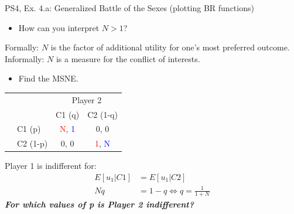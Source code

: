 \begin{frame}{PS4, Ex. 4.a: Generalized Battle of the Sexes (plotting BR functions)}
  \begin{multicols}{2}
    \begin{itemize}
      \item[(a)] How can you interpret $N > 1$?
    \end{itemize}
    Formally: $N$ is the factor of additional utility for one's most preferred outcome.\\\medskip
    Informally: $N$ is a measure for the conflict of interests.
    \begin{itemize}
      \item[(b)] Find the MSNE.
    \end{itemize}
    \vspace{-8pt}
    \begin{table}
      \begin{tabular}{cl|c|c|}
          & \multicolumn{1}{c}{} & \multicolumn{2}{c}{\color{blue}Player 2}\\
          \parbox[t]{1mm}{}
          &  &  &  \\
          & C1 (p)    & \textcolor{red}{N}, \textcolor{blue}{1} & 0, 0 \\
          & C2 (1-p)  & 0, 0 & \textcolor{red}{1}, \textcolor{blue}{N} \\
      \end{tabular}
    \end{table}
    Player 1 is indifferent for:
    \begin{align*}
      E[u_1|C1]&=E[u_1|C2]\\
      Nq &= 1-q \Leftrightarrow q = \frac{1}{1+N}
    \end{align*}
    \vspace{-8pt}
  \vfill\null \columnbreak
    \textbf{\textit{For which values of p is Player 2 indifferent?}}
  \vfill\null
  \end{multicols}
\end{frame}
